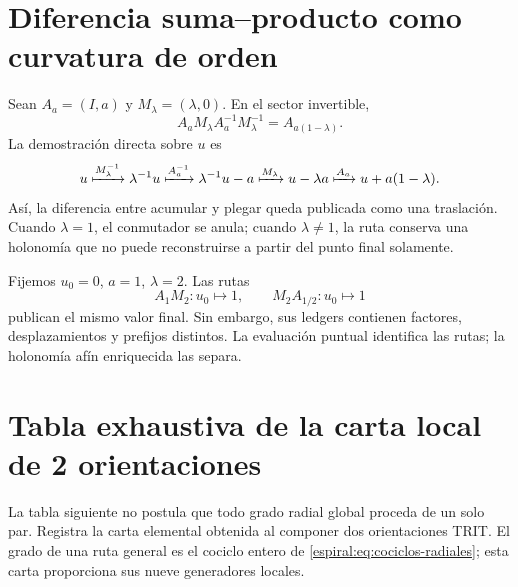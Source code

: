 \section{Diferencia suma--producto como curvatura de orden}

Sean \(A_a=(I,a)\) y \(M_\lambda=(\lambda,0)\). En el sector invertible,
\[
 A_aM_\lambda A_a^{-1}M_\lambda^{-1}
 =A_{a(1-\lambda)}.
\]
La demostración directa sobre \(u\) es
\[
 u\xmapsto{M_\lambda^{-1}}\lambda^{-1}u
 \xmapsto{A_a^{-1}}\lambda^{-1}u-a
 \xmapsto{M_\lambda}u-\lambda a
 \xmapsto{A_a}u+a(1-\lambda).
\]
Así, la diferencia entre acumular y plegar queda publicada como una
traslación. Cuando \(\lambda=1\), el conmutador se anula; cuando
\(\lambda\neq1\), la ruta conserva una holonomía que no puede reconstruirse
a partir del punto final solamente.

\begin{example}
Fijemos \(u_0=0\), \(a=1\), \(\lambda=2\). Las rutas
\[
 A_1M_2:u_0\longmapsto1,
 \qquad
 M_2A_{1/2}:u_0\longmapsto1
\]
publican el mismo valor final. Sin embargo, sus ledgers contienen factores,
desplazamientos y prefijos distintos. La evaluación puntual identifica las
rutas; la holonomía afín enriquecida las separa.
\end{example}

\section{Tabla exhaustiva de la carta local de 2 orientaciones}

La tabla siguiente no postula que todo grado radial global proceda de un
solo par. Registra la carta elemental obtenida al componer dos orientaciones
TRIT. El grado de una ruta general es el cociclo entero de
\cref{espiral:eq:cociclos-radiales}; esta carta proporciona sus nueve generadores
locales.

